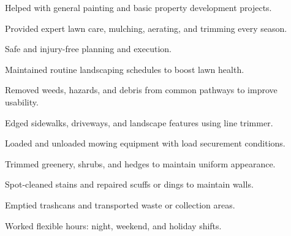 \begin{cventries}
{\begin{cvitems}
        \item {Helped with general painting and basic property development projects.}
        \item {Provided expert lawn care, mulching, aerating, and trimming every season.}
        \item {Safe and injury-free planning and execution.}
        \item {Maintained routine landscaping schedules to boost lawn health.}
        \item {Removed weeds, hazards, and debris from common pathways to improve usability.}
        \item{Edged sidewalks, driveways, and landscape features using line trimmer.}
        \item{Loaded and unloaded mowing equipment with load securement conditions.}
        \item{Trimmed greenery, shrubs, and hedges to maintain uniform appearance.}
        \item{Spot-cleaned stains and repaired scuffs or dings to maintain walls.}
        \item{Emptied trashcans and transported waste or collection areas.}
        \item{Worked flexible hours: night, weekend, and holiday shifts.}
      \end{cvitems}
    }


\end{cventries}
